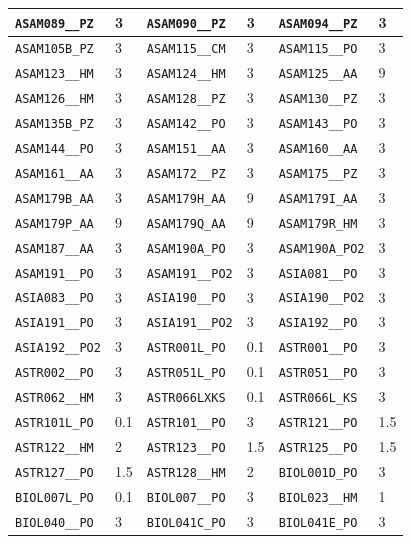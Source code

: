 \begin{longtable}{|l|l||l|l||l|l|}
    \verb|ASAM089__PZ| & 3 & \verb|ASAM090__PZ| & 3 & \verb|ASAM094__PZ| & 3\\\hline
    \verb|ASAM105B_PZ| & 3 & \verb|ASAM115__CM| & 3 & \verb|ASAM115__PO| & 3\\\hline
    \verb|ASAM123__HM| & 3 & \verb|ASAM124__HM| & 3 & \verb|ASAM125__AA| & 9\\\hline
    \verb|ASAM126__HM| & 3 & \verb|ASAM128__PZ| & 3 & \verb|ASAM130__PZ| & 3\\\hline
    \verb|ASAM135B_PZ| & 3 & \verb|ASAM142__PO| & 3 & \verb|ASAM143__PO| & 3\\\hline
    \verb|ASAM144__PO| & 3 & \verb|ASAM151__AA| & 3 & \verb|ASAM160__AA| & 3\\\hline
    \verb|ASAM161__AA| & 3 & \verb|ASAM172__PZ| & 3 & \verb|ASAM175__PZ| & 3\\\hline
    \verb|ASAM179B_AA| & 3 & \verb|ASAM179H_AA| & 9 & \verb|ASAM179I_AA| & 3\\\hline
    \verb|ASAM179P_AA| & 9 & \verb|ASAM179Q_AA| & 9 & \verb|ASAM179R_HM| & 3\\\hline
    \verb|ASAM187__AA| & 3 & \verb|ASAM190A_PO| & 3 & \verb|ASAM190A_PO2| & 3\\\hline
    \verb|ASAM191__PO| & 3 & \verb|ASAM191__PO2| & 3 & \verb|ASIA081__PO| & 3\\\hline
    \verb|ASIA083__PO| & 3 & \verb|ASIA190__PO| & 3 & \verb|ASIA190__PO2| & 3\\\hline
    \verb|ASIA191__PO| & 3 & \verb|ASIA191__PO2| & 3 & \verb|ASIA192__PO| & 3\\\hline
    \verb|ASIA192__PO2| & 3 & \verb|ASTR001L_PO| & 0.1 & \verb|ASTR001__PO| & 3\\\hline
    \verb|ASTR002__PO| & 3 & \verb|ASTR051L_PO| & 0.1 & \verb|ASTR051__PO| & 3\\\hline
    \verb|ASTR062__HM| & 3 & \verb|ASTR066LXKS| & 0.1 & \verb|ASTR066L_KS| & 3\\\hline
    \verb|ASTR101L_PO| & 0.1 & \verb|ASTR101__PO| & 3 & \verb|ASTR121__PO| & 1.5\\\hline
    \verb|ASTR122__HM| & 2 & \verb|ASTR123__PO| & 1.5 & \verb|ASTR125__PO| & 1.5\\\hline
    \verb|ASTR127__PO| & 1.5 & \verb|ASTR128__HM| & 2 & \verb|BIOL001D_PO| & 3\\\hline
    \verb|BIOL007L_PO| & 0.1 & \verb|BIOL007__PO| & 3 & \verb|BIOL023__HM| & 1\\\hline
    \verb|BIOL040__PO| & 3 & \verb|BIOL041C_PO| & 3 & \verb|BIOL041E_PO| & 3\\\hline

\end{longtable}
